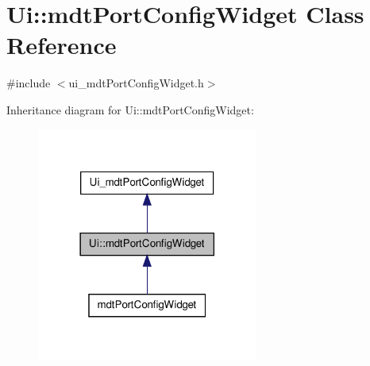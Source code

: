 \hypertarget{class_ui_1_1mdt_port_config_widget}{\section{Ui\-:\-:mdt\-Port\-Config\-Widget Class Reference}
\label{class_ui_1_1mdt_port_config_widget}
}


{\ttfamily \#include $<$ui\-\_\-mdt\-Port\-Config\-Widget.\-h$>$}



Inheritance diagram for Ui\-:\-:mdt\-Port\-Config\-Widget\-:\nopagebreak
\begin{figure}[H]
\begin{center}
\leavevmode
\includegraphics[width=206pt]{class_ui_1_1mdt_port_config_widget__inherit__graph}
\end{center}
\end{figure}


